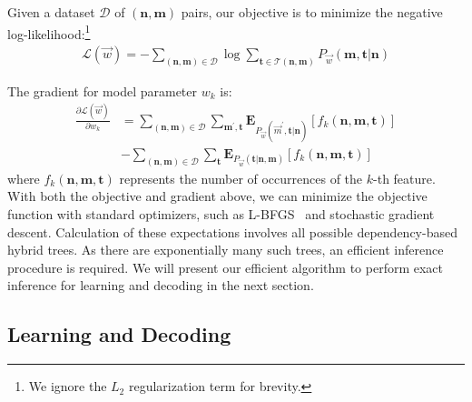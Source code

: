 Given a dataset $\mathcal{D}$ of $(\boldsymbol{n}, \boldsymbol{m})$ pairs, our objective is to minimize the negative log-likelihood:\footnote{We ignore the $L_2$ regularization term for brevity.}
\begin{equation}
\begin{split}
\mathcal{L} (\vec{w}) = 
-  \!\!\!\!\!\!
\sum_{(\boldsymbol{n}, \boldsymbol{m}) \in \mathcal{D}}
\!\!\!
\log
\!\!
\sum_{\boldsymbol{t} \in \mathcal{T} (\boldsymbol{n}, \boldsymbol{m}) }  
\!\!
P_\vec{w} (\boldsymbol{m}, \boldsymbol{t} | \boldsymbol{n})
\end{split}
\label{equ:obj}
\end{equation}


The gradient for  model parameter $w_k$ is:
\begin{align}
\frac{\partial \mathcal{L}(\vec{w})}{\partial w_k}
&=\!\!\!\!\!\!\!
\sum_{(\boldsymbol{n}, \boldsymbol{m}) \in \mathcal{D}}
\sum_{\boldsymbol{m}^\prime, \boldsymbol{t} }
\mathbf{E}_{P_\vec{w}(\vec{m}^\prime, \boldsymbol{t} | \boldsymbol{n}) }
[ f_k (\boldsymbol{n}, \boldsymbol{m}, \boldsymbol{t}) ]\nonumber\\
& - \!\!\!\!\!
\sum_{(\boldsymbol{n}, \boldsymbol{m}) \in \mathcal{D}}
\sum_{\boldsymbol{t} }
\mathbf{E}_{P_\vec{w}(\boldsymbol{t} | \boldsymbol{n}, \boldsymbol{m}) }
[ f_k (\boldsymbol{n}, \boldsymbol{m}, \boldsymbol{t}) ]\nonumber
\end{align}
where $f_k (\boldsymbol{n}, \boldsymbol{m}, \boldsymbol{t})$ represents the number of occurrences of the $k$-th feature. 
With both the objective and gradient above, we can minimize the objective function with standard optimizers, such as L-BFGS~\cite{liu1989limited}  and stochastic gradient descent. 
Calculation of these expectations involves all possible dependency-based hybrid trees.
As there are exponentially many such trees, 
an efficient inference procedure is required.
We will present our efficient algorithm to perform  exact inference for learning and decoding in the next section. 


\subsection{Learning and Decoding}
\label{sec:learninganddecode}

